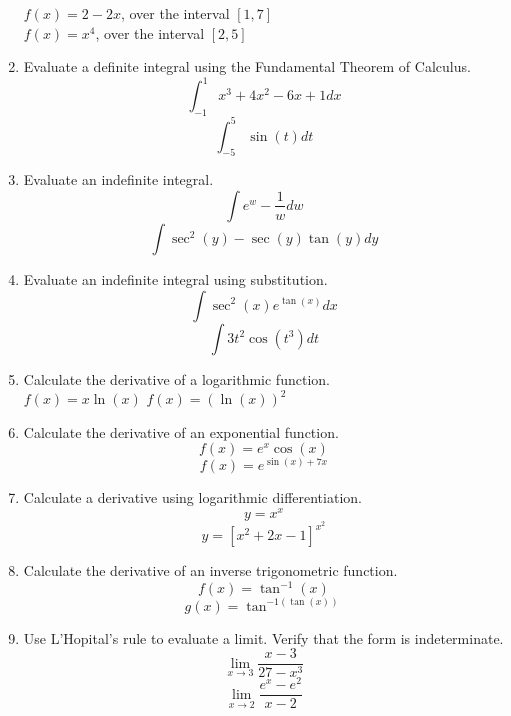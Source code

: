 \documentclass{exam}
\begin{document}
\begin{enumerate}
$f(x) = 2-2x$, over the interval $[1,7]$\\
$f(x) = x^4$, over the interval $[2,5]$
\item Evaluate a definite integral using the Fundamental Theorem of Calculus.\\
$$\int_{-1}^1 x^3 + 4x^2 - 6x + 1 dx$$
$$\int_{-5}^5 \sin(t) dt$$
\item Evaluate an indefinite integral.\\
$$\int e^w - \frac{1}{w} dw$$
$$ \int \sec^2(y) - \sec(y)\tan(y) dy$$
\item Evaluate an indefinite integral using substitution.\\
$$\int \sec^2(x) e^{\tan(x)}dx$$
$$\int 3t^2 \cos(t^3) dt$$
\item Calculate the derivative of a logarithmic function.\\
$f(x) = x\ln(x)$
$f(x) = (\ln(x))^2$
\item Calculate the derivative of an exponential function.\\
$$f(x) = e^x\cos(x)$$
$$f(x) = e^{\sin(x) + 7x}$$
\item Calculate a derivative using logarithmic differentiation.\\
$$y =x^x$$
$$y = [x^2 + 2x-1]^{x^2}$$
\item Calculate the derivative of an inverse trigonometric function.\\
$$f(x) = \tan^{-1}(x)$$
$$g(x) = \tan^{-1(\tan(x))}$$
\item Use L'Hopital's rule to evaluate a limit. Verify that the form is indeterminate.\\
$$\lim_{x\rightarrow 3} \frac{x-3}{27 - x^3}$$ 
$$\lim_{x\rightarrow 2} \frac{e^x - e^2}{x-2}$$
\end{enumerate}
\end{document}
